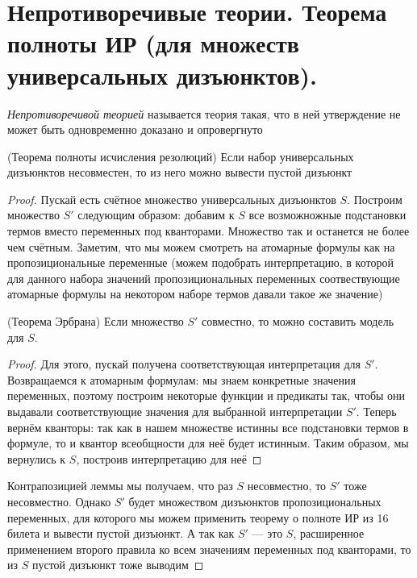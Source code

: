 \documentclass{article}
\begin{document}
\section{Непротиворечивые теории. Теорема полноты ИР (для множеств универсальных дизъюнктов).}
\begin{definition}
	\textit{Непротиворечивой теорией} называется теория такая, что в ней утверждение не может быть одновременно доказано и опровергнуто
\end{definition}

\begin{theorem}{(Теорема полноты исчисления резолюций)}
	Если набор универсальных дизъюнктов несовместен, то из него можно вывести пустой дизъюнкт
\end{theorem}
\begin{proof}
	Пускай есть счётное множество универсальных дизъюнктов $S$. Построим множество $S'$ следующим образом: добавим к $S$ все возможножные подстановки термов вместо переменных под кванторами. Множество так и останется не более чем счётным. Заметим, что мы можем смотреть на атомарные формулы как на пропозициональные переменные (можем подобрать интерпретацию, в которой для данного набора значений пропозициональных переменных соотвествующие атомарные формулы на некотором наборе термов давали такое же значение)
	
	\begin{lemma}{(Теорема Эрбрана)}
	    Если множество $S'$ совместно, то можно составить модель для $S$.
	\end{lemma}
	
	\begin{proof}
	     Для этого, пускай получена соответствующая интерпретация для $S'$. Возвращаемся к атомарным формулам: мы знаем конкретные значения переменных, поэтому построим некоторые функции и предикаты так, чтобы они выдавали соответствующие значения для выбранной интерпретации $S'$. Теперь вернём кванторы: так как в нашем множестве истинны все подстановки термов в формуле, то и квантор всеобщности для неё будет истинным. Таким образом, мы вернулись к $S$, построив интерпретацию для неё
	\end{proof}
	
	Контрапозицией леммы мы получаем, что раз $S$ несовместно, то $S'$ тоже несовместно. Однако $S'$ будет множеством дизъюнктов пропозициональных переменных, для которого мы можем применить теорему о полноте ИР из 16 билета и вывести пустой дизъюнкт. А так как $S'$ --- это $S$, расширенное применением второго правила ко всем значениям переменных под кванторами, то из $S$ пустой дизъюнкт тоже выводим
	
\end{proof}
\end{document}
